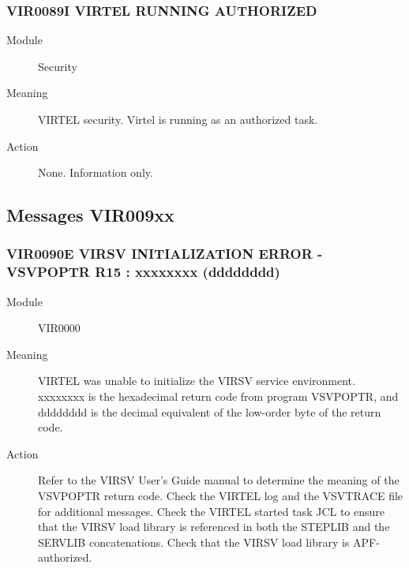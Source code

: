 \documentclass[letterpaper,10pt,english]{sphinxmanual}
\begin{document}
\subsubsection{VIR0089I VIRTEL RUNNING AUTHORIZED}
\label{\detokenize{messages:vir0089i-virtel-running-authorized}}\begin{description}
\item[{Module}] \leavevmode
Security

\item[{Meaning}] \leavevmode
VIRTEL security. Virtel is running as an authorized task.

\item[{Action}] \leavevmode
None. Information only.

\end{description}


\subsection{Messages VIR009xx}
\label{\detokenize{messages:messages-vir009xx}}

\subsubsection{VIR0090E VIRSV INITIALIZATION ERROR -VSVPOPTR R15 : xxxxxxxx (dddddddd)}
\label{\detokenize{messages:vir0090e-virsv-initialization-error-vsvpoptr-r15-xxxxxxxx-dddddddd}}\begin{description}
\item[{Module}] \leavevmode
VIR0000

\item[{Meaning}] \leavevmode
VIRTEL was unable to initialize the VIRSV service environment. xxxxxxxx is the hexadecimal return code from program VSVPOPTR, and dddddddd is the decimal equivalent of the low-order byte of the return code.

\item[{Action}] \leavevmode
Refer to the VIRSV User’s Guide manual to determine the meaning of the VSVPOPTR return code. Check the VIRTEL log and the VSVTRACE file for additional messages. Check the VIRTEL started task JCL to ensure that the VIRSV load library is referenced in both the STEPLIB and the SERVLIB concatenations. Check that the VIRSV load library is APF- authorized.

\end{description}
\end{document}
